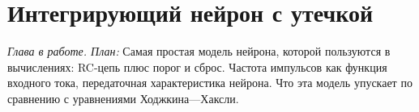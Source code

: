 \chapter{Интегрирующий нейрон с утечкой}
\label{sec:lif}

\emph{Глава в работе. План:} Самая простая модель нейрона, которой пользуются в вычислениях: RC-цепь плюс порог и сброс. Частота импульсов как функция входного тока, передаточная характеристика нейрона. Что эта модель упускает по сравнению с уравнениями Ходжкина---Хаксли.
